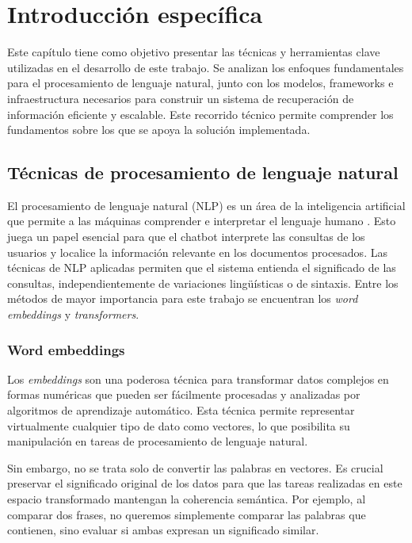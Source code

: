 \chapter{Introducción específica} %

\label{Chapter2}


Este capítulo tiene como objetivo presentar las técnicas y herramientas clave utilizadas en el 
desarrollo de este trabajo. Se analizan los enfoques fundamentales para el procesamiento de 
lenguaje natural, junto con los modelos, frameworks e infraestructura necesarios para 
construir un sistema de recuperación de información eficiente y escalable. Este recorrido 
técnico permite comprender los fundamentos sobre los que se apoya la solución implementada. 

\section{Técnicas de procesamiento de lenguaje natural}

El procesamiento de lenguaje natural (NLP) es un área de la inteligencia artificial que permite 
a las máquinas comprender e interpretar el lenguaje humano \citep{book:nlp}. Esto juega un papel esencial 
para que el chatbot interprete las consultas de los usuarios y localice la información relevante en los 
documentos procesados. Las técnicas de NLP aplicadas permiten que el sistema entienda el 
significado de las consultas, independientemente de variaciones lingüísticas o de sintaxis. Entre los 
métodos de mayor importancia para este trabajo se encuentran los \textit{word embeddings} y
\textit{transformers}.

\subsection{Word embeddings}

Los \textit{embeddings} son una poderosa técnica para transformar datos complejos en formas numéricas que 
pueden ser fácilmente procesadas y analizadas por algoritmos de aprendizaje automático. Esta técnica permite 
representar virtualmente cualquier tipo de dato como vectores, lo que posibilita su manipulación en tareas de 
procesamiento de lenguaje natural.

Sin embargo, no se trata solo de convertir las palabras en vectores. Es crucial preservar el significado original 
de los datos para que las tareas realizadas en este espacio transformado mantengan la coherencia semántica. 
Por ejemplo, al comparar dos frases, no queremos simplemente comparar las palabras que contienen, sino evaluar 
si ambas expresan un significado similar.

